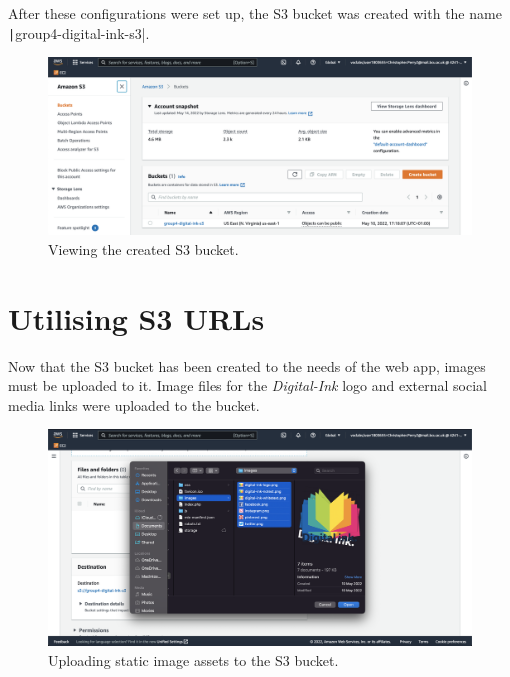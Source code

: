 After these configurations were set up, the S3 bucket was created with the name \texttt|group4-digital-ink-s3|.

\begin{figure}[!htbp]
    \centering
    \includegraphics[width=125mm]{resources/s3/s3-created}
    \caption{Viewing the created S3 bucket.}
    \label{fig:s3-created}
\end{figure}

\pagebreak
\section{Utilising S3 URLs}
Now that the S3 bucket has been created to the needs of the web app, images must be uploaded to it.
Image files for the \textit{Digital-Ink} logo and external social media links were uploaded to the bucket.

\begin{figure}[!htbp]
    \centering
    \includegraphics[width=\textwidth]{resources/s3/s3-image-upload}
    \caption{Uploading static image assets to the S3 bucket.}
    \label{fig:s3-image-upload}
\end{figure}

